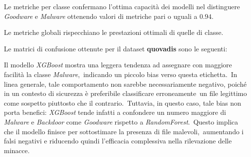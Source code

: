\begin{figure}[]
    \centering
    \caption{}
    \label{fig:mpasco-rf-rc}
\end{figure}

\begin{figure}[]
    \centering
    \caption{}
    \label{fig:mpasco-rf-f1}
\end{figure}

\FloatBarrier


Le metriche per classe confermano l'ottima capacità dei modelli nel distinguere \textit{Goodware} e \textit{Malware} ottenendo valori
di metriche pari o uguali a $0.94$.

\begin{figure}[t]
    \centering
    \caption{}
    \label{fig:octack-mtrx-rf}
\end{figure}

\FloatBarrier

Le metriche globali rispecchiano le prestazioni ottimali di quelle di classe.


Le matrici di confusione ottenute per il dataset \textbf{quovadis} sono le seguenti:

\begin{figure}[t]
    \centering
    \caption{}
    \label{fig:octack-mtrx-rf}
\end{figure}

\FloatBarrier

Il modello \textit{XGBoost} mostra una leggera tendenza ad assegnare con maggiore facilità la classe \textit{Malware},\
indicando un piccolo bias verso questa etichetta.\
In linea generale, tale comportamento non sarebbe necessariamente negativo, poiché in un contesto di sicurezza è preferibile classificare erroneamente\
un file legittimo come sospetto piuttosto che il contrario.\
Tuttavia, in questo caso, tale bias non porta benefici: \textit{XGBoost} tende infatti a confondere un numero maggiore di \textit{Malware} e \textit{Backdoor} come \textit{Goodware} rispetto a \textit{RandomForest}.\
Questo implica che il modello finisce per sottostimare la presenza di file malevoli,\
aumentando i falsi negativi e riducendo quindi l'efficacia complessiva nella rilevazione delle minacce.

